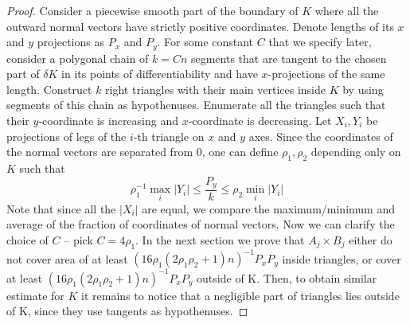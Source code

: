 \documentclass{amsart}
\theoremstyle{remark}
\numberwithin{equation}{section}
\numberwithin{figure}{section}
\begin{document}
\begin{proof}
	Consider a piecewise smooth part of the boundary of $K$ where all the outward normal vectors have strictly positive coordinates. Denote lengths of its $x$ and $y$ projections as $P_x$ and $P_y$. For some constant $C$ that we specify later, consider a polygonal chain of $k = Cn$ segments that are tangent to the chosen part of $\delta K$ in its points of differentiability and have $x$-projections of the same length. Construct $k$ right triangles with their main vertices inside $K$ by using segments of this chain as hypothenuses. Enumerate all the triangles such that their $y$-coordinate is increasing and $x$-coordinate is decreasing. Let $X_i, Y_i$ be projections of legs of the $i$-th triangle on $x$ and $y$ axes. Since the coordinates of the normal vectors are separated from 0, one can define $\rho_1, \rho_2$ depending only on $K$ such that
	\[
	\rho_1^{-1} \max_i |Y_i| \leq \frac{P_y}{k}\leq \rho_2\min_i |Y_i|
	\]
	Note that since all the $|X_i|$ are equal, we compare the maximum/minimum and average of the fraction of coordinates of normal vectors. Now we can clarify the choice of $C$ -- pick $C = 4\rho_1$. In the next section we prove that $A_j \times B_j$ either do not cover area of at least $(16 \rho_1 (2\rho_1\rho_2+1) n)^{-1} P_x P_y $ inside triangles, or cover at least $(16 \rho_1 (2\rho_1\rho_2+1)  n)^{-1} P_x P_y$ outside of K. Then, to obtain similar estimate for $K$ it remains to notice that a negligible part of triangles lies outside of K, since they use tangents as hypothenuses. 
	

\end{proof}
\end{document}
